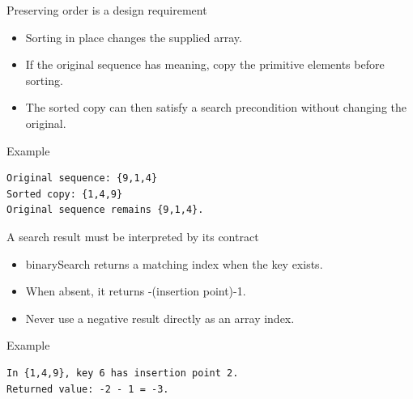 \documentclass[10pt,aspectratio=169]{beamer}
\begin{document}
\begin{frame}[fragile,t]{Preserving order is a design requirement}
\begin{itemize}
\item Sorting in place changes the supplied array.
\item If the original sequence has meaning, copy the primitive elements before sorting.
\item The sorted copy can then satisfy a search precondition without changing the original.
\end{itemize}
\vspace{1mm}\begin{block}{Example}
\begin{lstlisting}
Original sequence: {9,1,4}
Sorted copy: {1,4,9}
Original sequence remains {9,1,4}.
\end{lstlisting}
\end{block}
\end{frame}

\begin{frame}[fragile,t]{A search result must be interpreted by its contract}
\begin{itemize}
\item binarySearch returns a matching index when the key exists.
\item When absent, it returns -(insertion point)-1.
\item Never use a negative result directly as an array index.
\end{itemize}
\vspace{1mm}\begin{block}{Example}
\begin{lstlisting}
In {1,4,9}, key 6 has insertion point 2.
Returned value: -2 - 1 = -3.
\end{lstlisting}
\end{block}
\end{frame}
\end{document}
